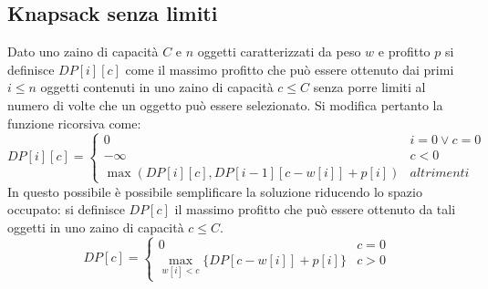 \subsection{Knapsack senza limiti}
Dato uno zaino di capacit\`a $C$ e $n$ oggetti caratterizzati da peso $w$ e profitto $p$ si definisce $DP[i][c]$ come il massimo profitto che pu\`o essere
ottenuto dai primi $i\le n$ oggetti contenuti in uno zaino di capacit\`a $c\le C$ senza porre limiti al numero di volte che un oggetto pu\`o essere 
selezionato. Si modifica pertanto la funzione ricorsiva come:
$$
DP[i][c] =
\begin{cases}
0\quad & i = 0 \lor c = 0\\
-\infty & c<0\\
\max(DP[i][c], DP[i-1][c-w[i]]+p[i]) & altrimenti
\end{cases}
$$
In questo possibile \`e possibile semplificare la soluzione riducendo lo spazio occupato: si definisce $DP[c]$ il massimo profitto che pu\`o essere ottenuto
da tali oggetti in uno zaino di capacit\`a $c\le C$. 
$$
DP[c] =
\begin{cases}
0\quad & c = 0\\
\max\limits_{w[i]<c}\{DP[c-w[i]]+p[i]\} &  c > 0
\end{cases}
$$
